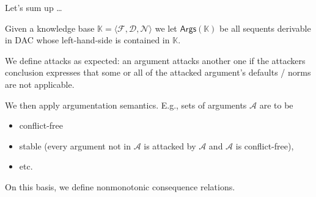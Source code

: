 \documentclass[aspectratio=169]{beamer}
\begin{document}

\begin{frame}[label={sec:orgd9716e2},standout]{}
Let's sum up \ldots{}
\end{frame}

\begin{frame}[label={sec:org9d76563}]{}
Given a knowledge base \(\mathbb{K} = \langle \mathcal{F}, \mathcal{D}, \mathcal{N} \rangle\) we let \alert{\(\mathsf{Args}(\mathbb{K})\)} be all sequents derivable in DAC whose left-hand-side is contained in \(\mathbb{K}\).
\pause

We define \alert{attacks} as expected: an argument attacks another one if the attackers conclusion expresses that some or all of the attacked argument's defaults / norms are not applicable.
\pause

We then apply \alert{argumentation semantics}. E.g., sets of arguments \(\mathcal{A}\) are to be
\begin{itemize}
\item conflict-free
\item stable (every argument not in \(\mathcal{A}\) is attacked by \(\mathcal{A}\) and \(\mathcal{A}\) is conflict-free),
\item etc.
\end{itemize}
\pause

On this basis, we define nonmonotonic \alert{consequence relations}.

\end{frame}
\end{document}

